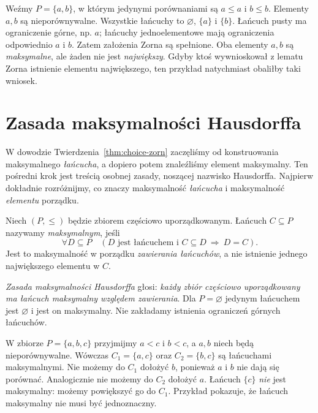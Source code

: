\begin{przyklad}
Weźmy $P=\{a,b\}$, w którym jedynymi porównaniami
są $a\le a$ i $b\le b$. Elementy $a,b$ są
nieporównywalne. Wszystkie łańcuchy to
$\varnothing$, $\{a\}$ i $\{b\}$.
Łańcuch pusty ma ograniczenie górne, np. $a$;
łańcuchy jednoelementowe mają ograniczenia
odpowiednio $a$ i $b$. Zatem założenia Zorna są spełnione.
Oba elementy $a,b$ są \emph{maksymalne},
ale żaden nie jest \emph{największy}.
Gdyby ktoś wywnioskował z lematu Zorna istnienie
elementu największego, ten przykład natychmiast
obaliłby taki wniosek.
\end{przyklad}

\section{Zasada maksymalności Hausdorffa}\label{sec:choice-hausdorff}

W dowodzie Twierdzenia~\ref{thm:choice-zorn}
zaczęliśmy od konstruowania maksymalnego \emph{łańcucha},
a dopiero potem znaleźliśmy element maksymalny.
Ten pośredni krok jest treścią osobnej zasady,
noszącej nazwisko Hausdorffa. Najpierw dokładnie
rozróżnijmy, co znaczy maksymalność \emph{łańcucha}
i maksymalność \emph{elementu} porządku.

\begin{definicja}\label{def:hausdorff-maximal-chain}
Niech $(P,\le)$ będzie zbiorem częściowo uporządkowanym.
Łańcuch $C\subseteq P$ nazywamy \emph{maksymalnym}, jeśli
\[
\forall D\subseteq P\quad
 (D\text{ jest łańcuchem i }C\subseteq D\ \Longrightarrow\ D=C).
\]
Jest to maksymalność w porządku \emph{zawierania łańcuchów},
a nie istnienie jednego największego elementu w $C$.
\end{definicja}

\begin{definicja}\label{def:hausdorff-principle}
\emph{Zasada maksymalności Hausdorffa} głosi:
\emph{każdy zbiór częściowo uporządkowany ma
łańcuch maksymalny względem zawierania}.
Dla $P=\varnothing$ jedynym łańcuchem jest
$\varnothing$ i jest on maksymalny. Nie zakładamy
istnienia ograniczeń górnych łańcuchów.
\end{definicja}

\begin{przyklad}
W zbiorze $P=\{a,b,c\}$ przyjmijmy $a<c$ i $b<c$,
a $a,b$ niech będą nieporównywalne.
Wówczas $C_1=\{a,c\}$ oraz $C_2=\{b,c\}$
są łańcuchami maksymalnymi. Nie możemy do $C_1$
dołożyć $b$, ponieważ $a$ i $b$ nie dają się porównać.
Analogicznie nie możemy do $C_2$ dołożyć $a$.
Łańcuch $\{c\}$ \emph{nie} jest maksymalny:
możemy powiększyć go do $C_1$.
Przykład pokazuje, że łańcuch maksymalny
nie musi być jednoznaczny.
\end{przyklad}

